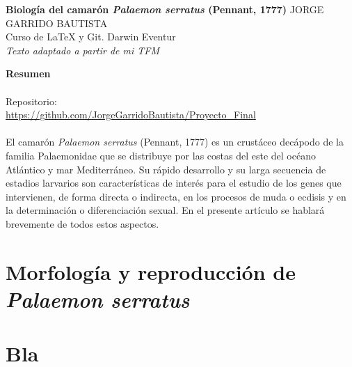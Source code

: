 \documentclass[a4paper]{article}
\begin{document}
\begin{titlepage}
\begin{center}
\vspace*{5\baselineskip} %
{\LARGE \textbf{Biología del camarón \textit{Palaemon serratus} (Pennant, 1777)}}
\vspace*{5\baselineskip}
\vfill %
{\large JORGE GARRIDO BAUTISTA}\\
\vspace*{4\baselineskip}
Curso de LaTeX y Git. Darwin Eventur\\
\textit{Texto adaptado a partir de mi TFM}
\end{center}
\end{titlepage}

\begin{titlepage}
{\Large \textbf{Resumen}}\\
\\
Repositorio:\\
\url{https://github.com/JorgeGarridoBautista/Proyecto_Final}\\
\\
El camarón \textit{Palaemon serratus} (Pennant, 1777) es un crustáceo decápodo de la familia Palaemonidae que se distribuye por las costas del este del océano Atlántico y mar Mediterráneo. Su rápido desarrollo y su larga secuencia de estadios larvarios son características de interés para el estudio de los genes que intervienen, de forma directa o indirecta, en los procesos de muda o ecdisis y en la determinación o diferenciación sexual. En el presente artículo se hablará brevemente de todos estos aspectos.
\end{titlepage}

\tableofcontents

\section{Morfología y reproducción de \textit{Palaemon serratus}}

\section{Bla}
\end{document}
